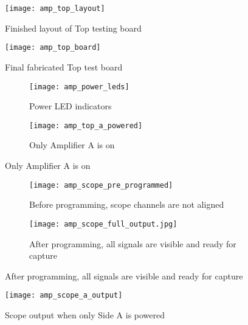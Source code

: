\begin{figure}[!htb]
	\centering
	\texttt{[image: amp\_top\_layout]}
	\caption{Finished layout of Top testing board}
\end{figure}

\begin{figure}[!htb]
	\centering
	\texttt{[image: amp\_top\_board]}
	\caption{Final fabricated Top test board}
\end{figure}

\begin{figure}[!htb]
	\centering
	\begin{subfigure}[b]{0.6\textwidth}
		\texttt{[image: amp\_power\_leds]}
		\caption{Power LED indicators}
		\centering
	\end{subfigure}
	\begin{subfigure}[b]{0.39\textwidth}
		\texttt{[image: amp\_top\_a\_powered]}
		\caption{Only Amplifier A is on}
	\end{subfigure}
\end{figure}

\begin{figure}[!htb]
	\centering
	\begin{subfigure}[b]{0.49\textwidth}
		\texttt{[image: amp\_scope\_pre\_programmed]}
		\caption{Before programming, scope channels are not aligned}
	\end{subfigure}
	\begin{subfigure}[b]{0.49\textwidth}
		\texttt{[image: amp\_scope\_full\_output.jpg]}
		\caption{After programming, all signals are visible and ready for capture}
	\end{subfigure}
\end{figure}

\begin{figure}[!htb]
	\centering
	\texttt{[image: amp\_scope\_a\_output]}
	\caption{Scope output when only Side A is powered}
	\centering
\end{figure}


